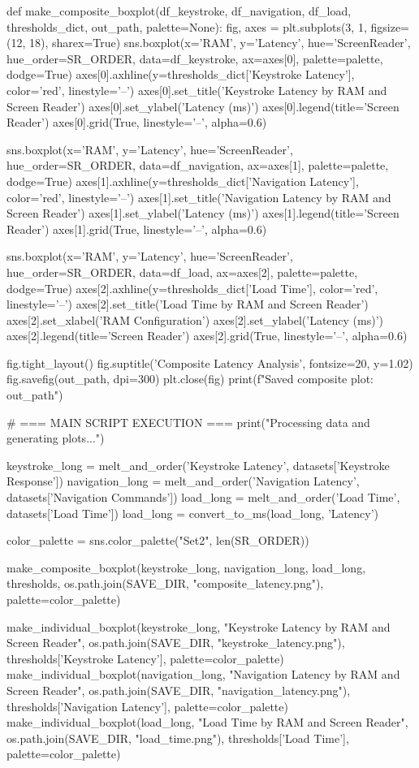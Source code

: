 \begin{pyverbatim}
	def make_composite_boxplot(df_keystroke, df_navigation, df_load, thresholds_dict, out_path, palette=None):
	fig, axes = plt.subplots(3, 1, figsize=(12, 18), sharex=True)
	sns.boxplot(x='RAM', y='Latency', hue='ScreenReader', hue_order=SR_ORDER,
	data=df_keystroke, ax=axes[0], palette=palette, dodge=True)
	axes[0].axhline(y=thresholds_dict['Keystroke Latency'], color='red', linestyle='--')
	axes[0].set_title('Keystroke Latency by RAM and Screen Reader')
	axes[0].set_ylabel('Latency (ms)')
	axes[0].legend(title='Screen Reader')
	axes[0].grid(True, linestyle='--', alpha=0.6)

	sns.boxplot(x='RAM', y='Latency', hue='ScreenReader', hue_order=SR_ORDER,
	data=df_navigation, ax=axes[1], palette=palette, dodge=True)
	axes[1].axhline(y=thresholds_dict['Navigation Latency'], color='red', linestyle='--')
	axes[1].set_title('Navigation Latency by RAM and Screen Reader')
	axes[1].set_ylabel('Latency (ms)')
	axes[1].legend(title='Screen Reader')
	axes[1].grid(True, linestyle='--', alpha=0.6)

	sns.boxplot(x='RAM', y='Latency', hue='ScreenReader', hue_order=SR_ORDER,
	data=df_load, ax=axes[2], palette=palette, dodge=True)
	axes[2].axhline(y=thresholds_dict['Load Time'], color='red', linestyle='--')
	axes[2].set_title('Load Time by RAM and Screen Reader')
	axes[2].set_xlabel('RAM Configuration')
	axes[2].set_ylabel('Latency (ms)')
	axes[2].legend(title='Screen Reader')
	axes[2].grid(True, linestyle='--', alpha=0.6)

	fig.tight_layout()
	fig.suptitle('Composite Latency Analysis', fontsize=20, y=1.02)
	fig.savefig(out_path, dpi=300)
	plt.close(fig)
	print(f"Saved composite plot: {out_path}")

	# === MAIN SCRIPT EXECUTION ===
	print("Processing data and generating plots...")

	keystroke_long = melt_and_order('Keystroke Latency', datasets['Keystroke Response'])
	navigation_long = melt_and_order('Navigation Latency', datasets['Navigation Commands'])
	load_long = melt_and_order('Load Time', datasets['Load Time'])
	load_long = convert_to_ms(load_long, 'Latency')

	color_palette = sns.color_palette("Set2", len(SR_ORDER))

	make_composite_boxplot(keystroke_long, navigation_long, load_long, thresholds,
	os.path.join(SAVE_DIR, "composite_latency.png"), palette=color_palette)

	make_individual_boxplot(keystroke_long, "Keystroke Latency by RAM and Screen Reader",
	os.path.join(SAVE_DIR, "keystroke_latency.png"), thresholds['Keystroke Latency'], palette=color_palette)
	make_individual_boxplot(navigation_long, "Navigation Latency by RAM and Screen Reader",
	os.path.join(SAVE_DIR, "navigation_latency.png"), thresholds['Navigation Latency'], palette=color_palette)
	make_individual_boxplot(load_long, "Load Time by RAM and Screen Reader",
	os.path.join(SAVE_DIR, "load_time.png"), thresholds['Load Time'], palette=color_palette)


\end{pyverbatim}
